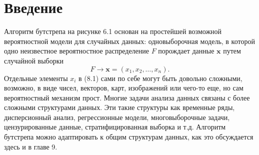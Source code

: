 \section{Введение}

Алгоритм бутстрепа на рисунке 6.1 основан на простейшей возможной вероятностной модели для случайных данных: одновыборочная модель, в которой одно неизвестное вероятностное распределение $F$ порождает данные $\textbf{x}$ путем случайной выборки
\begin{equation}
	F \to \textbf{x} = (x_1, x_2, \ldots , x_n).
\end{equation}
Отдельные элементы $x_i$ в (8.1) сами по себе могут быть довольно сложными, возможно, в виде чисел, векторов, карт, изображений или чего-то еще, но сам вероятностный механизм прост. Многие задачи анализа данных связаны с более сложными структурами данных. Эти такие структуры как временные ряды, дисперсионный анализ, регрессионные модели, многовыборочные задачи, цензурированные данные, стратифицированная выборка и т.д. Алгоритм бутстрепа можно адаптировать к общим структурам данных, как это обсуждается здесь и в главе 9.